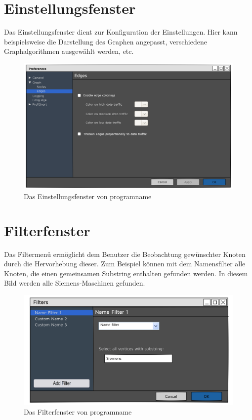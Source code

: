 \section{Einstellungsfenster}
Das Einstellungsfenster dient zur Konfiguration der Einstellungen. Hier kann beispielsweise die Darstellung des Graphen angepasst, verschiedene
Graphalgorithmen ausgewählt werden, etc.

  \begin{figure}[h!]
    \hspace*{0.3cm}\includegraphics[scale=0.07]{./img/Preferences.png}
    \caption[Das Einstellungsfenster von \gls{programname}]{Das Einstellungsfenster von \gls{programname}}
  \end{figure}

\newpage
\section{Filterfenster}
Das Filtermenü ermöglicht dem Benutzer die Beobachtung gewünschter Knoten durch die Hervorhebung dieser. Zum Beispiel können mit dem Namensfilter alle Knoten, die einen gemeinsamen Substring enthalten gefunden werden. In diesem Bild werden alle Siemens-Maschinen gefunden.

\begin{figure}[h!]
  \hspace*{0.2cm}\includegraphics[scale=0.06]{./img/Filters.png}
  \caption[Das Filterfenster von \gls{programname}]{Das Filterfenster von \gls{programname}}
\end{figure}
